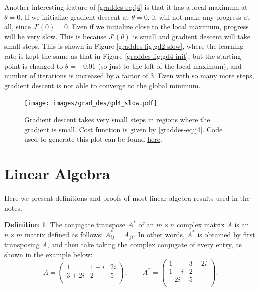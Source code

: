 \documentclass{article}
\theoremstyle{definition}
\newtheorem{definition}{Definition}[section]
\begin{document}
Another interesting feature of \eqref{graddes-eq:j4} is that it has a local maximum at $\theta=0$. If we initialize gradient descent at $\theta=0$, it will not make any progress at all, since $J'(0)=0$. Even if we initialize close to the local maximum, progress will be very slow. This is because $J'(\theta)$ is small and gradient descent will take small steps. This is shown in Figure \ref{graddes-fig:gd2-slow}, where the learning rate is kept the same as that in Figure \ref{graddes-fig:gd4-init}, but the starting point is changed to $\theta=-0.01$ (so just to the left of the local maximum), and number of iterations is increased by a factor of 3. Even with so many more steps, gradient descent is not able to converge to the global minimum.

\begin{figure}[ht]
\centering
\texttt{[image: images/grad\_des/gd4\_slow.pdf]}
\caption{Gradient descent takes very small steps in regions where the gradient is small. Cost function is given by \eqref{graddes-eq:j4}. Code used to generate this plot can be found \href{https://github.com/siavashaslanbeigi/ml_notes/blob/master/src/grad_des/basics.ipynb}{\color{blue} here}.}
\label{graddes-fig:gd4-slow}
\end{figure}


\clearpage
\appendix
\section{Linear Algebra}
Here we present definitions and proofs of most linear algebra results used in the notes.
\begin{definition}
The conjugate transpose $A^*$ of an $m\times n$ complex matrix $A$ is an $n \times m$ matrix defined as follows: $A^*_{ij}=\overline{A_{ji}}$. In other words, $A^*$ is obtained by first transposing $A$, and then take taking the complex conjugate of every entry, as shown in the example below:
\begin{equation}
    A =
    \begin{pmatrix}
        1 & 1+i & 2i \\
        3+2i & 2 & 5 \\
    \end{pmatrix},
    \qquad
    A^* =
    \begin{pmatrix}
        1 & 3-2i \\
        1-i & 2 \\
        -2i & 5 \\
    \end{pmatrix}.
\end{equation}
\end{definition}
\end{document}
